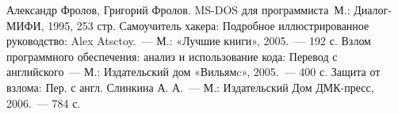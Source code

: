 \documentclass[russian, utf8, pointsubsection, emptystyle, simple]{eskdtext}
\begin{document}


\tableofcontents
\newpage





\begin{thebibliography}{99}
 Александр Фролов, Григорий Фролов. MS-DOS для
  программиста~М.: Диалог-МИФИ, 1995, 253 стр.
 Самоучитель хакера: Подробное иллюстрированное
  руководство: Alex Atsctoy.~--- М.: «Лучшие книги», 2005.~--- 192 с.
 Взлом программного обеспечения: анализ и использование
  кода: Перевод с английского~--- М.: Издательский дом «Вильямc»,
  2005.~--- 400 с.
 Защита от взлома: Пер. с англ. Слинкина А. А.~--- М.:
  Издательский Дом ДМК-пресс, 2006.~--- 784 с.
\end{thebibliography}



\end{document}
